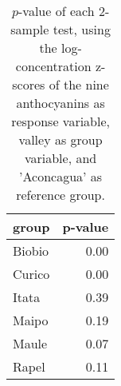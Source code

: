 \begin{table}[ht]
\centering
\begin{tabular}{lr}
  \hline
group & p-value \\ 
  \hline
Biobio & 0.00 \\ 
  Curico & 0.00 \\ 
  Itata & 0.39 \\ 
  Maipo & 0.19 \\ 
  Maule & 0.07 \\ 
  Rapel & 0.11 \\ 
   \hline
\end{tabular}
\caption{
            $p$-value of each 2-sample test, using the log-concentration 
            z-scores of the nine anthocyanins as response variable, 
            valley as group variable, and 'Aconcagua' 
            as reference group.
        } 
\label{tbl:2}
\end{table}
